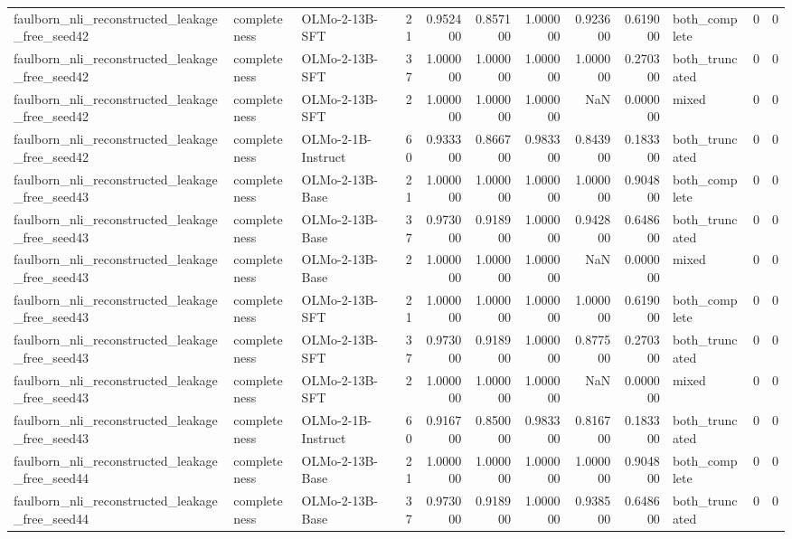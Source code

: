 \begin{tabular}{lllrrrrrrlrr}
faulborn_nli_reconstructed_leakage_free_seed42 & completeness & OLMo-2-13B-SFT & 21 & 0.952400 & 0.857100 & 1.000000 & 0.923600 & 0.619000 & both_complete & 0 & 0 \\
faulborn_nli_reconstructed_leakage_free_seed42 & completeness & OLMo-2-13B-SFT & 37 & 1.000000 & 1.000000 & 1.000000 & 1.000000 & 0.270300 & both_truncated & 0 & 0 \\
faulborn_nli_reconstructed_leakage_free_seed42 & completeness & OLMo-2-13B-SFT & 2 & 1.000000 & 1.000000 & 1.000000 & NaN & 0.000000 & mixed & 0 & 0 \\
faulborn_nli_reconstructed_leakage_free_seed42 & completeness & OLMo-2-1B-Instruct & 60 & 0.933300 & 0.866700 & 0.983300 & 0.843900 & 0.183300 & both_truncated & 0 & 0 \\
faulborn_nli_reconstructed_leakage_free_seed43 & completeness & OLMo-2-13B-Base & 21 & 1.000000 & 1.000000 & 1.000000 & 1.000000 & 0.904800 & both_complete & 0 & 0 \\
faulborn_nli_reconstructed_leakage_free_seed43 & completeness & OLMo-2-13B-Base & 37 & 0.973000 & 0.918900 & 1.000000 & 0.942800 & 0.648600 & both_truncated & 0 & 0 \\
faulborn_nli_reconstructed_leakage_free_seed43 & completeness & OLMo-2-13B-Base & 2 & 1.000000 & 1.000000 & 1.000000 & NaN & 0.000000 & mixed & 0 & 0 \\
faulborn_nli_reconstructed_leakage_free_seed43 & completeness & OLMo-2-13B-SFT & 21 & 1.000000 & 1.000000 & 1.000000 & 1.000000 & 0.619000 & both_complete & 0 & 0 \\
faulborn_nli_reconstructed_leakage_free_seed43 & completeness & OLMo-2-13B-SFT & 37 & 0.973000 & 0.918900 & 1.000000 & 0.877500 & 0.270300 & both_truncated & 0 & 0 \\
faulborn_nli_reconstructed_leakage_free_seed43 & completeness & OLMo-2-13B-SFT & 2 & 1.000000 & 1.000000 & 1.000000 & NaN & 0.000000 & mixed & 0 & 0 \\
faulborn_nli_reconstructed_leakage_free_seed43 & completeness & OLMo-2-1B-Instruct & 60 & 0.916700 & 0.850000 & 0.983300 & 0.816700 & 0.183300 & both_truncated & 0 & 0 \\
faulborn_nli_reconstructed_leakage_free_seed44 & completeness & OLMo-2-13B-Base & 21 & 1.000000 & 1.000000 & 1.000000 & 1.000000 & 0.904800 & both_complete & 0 & 0 \\
faulborn_nli_reconstructed_leakage_free_seed44 & completeness & OLMo-2-13B-Base & 37 & 0.973000 & 0.918900 & 1.000000 & 0.938500 & 0.648600 & both_truncated & 0 & 0 \\

\end{tabular}
